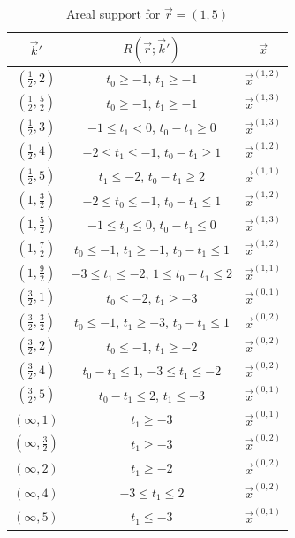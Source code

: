 \documentclass[11pt]{amsart}
\theoremstyle{definition}
\numberwithin{equation}{subsection}
\theoremstyle{plain}
\theoremstyle{plain}
\theoremstyle{plain}
\theoremstyle{plain}
\theoremstyle{plain}
\theoremstyle{plain}
\theoremstyle{plain}
\theoremstyle{plain}
\theoremstyle{plain}
\theoremstyle{plain}
\theoremstyle{plain}
\theoremstyle{plain}
\theoremstyle{definition}
\theoremstyle{definition}
\theoremstyle{definition}
\theoremstyle{remark}
\renewcommand{\(}{\textup{(}}
\renewcommand{\)}{\textup{)}}
\newcommand{\vx}{\vec{x}}
\newcommand{\vr}{\vec{r}}
\newcommand{\vk}{\vec{k}}
\begin{document}
\begin{table}[htbp]
  \centering
  \begin{tabular}{|c||c|c|}
    \hline
    $\vk'$ & $R(\vr;\vk')$ & $\vx$ \\\hline\hline
    $(\frac{1}{2},2)$ & $t_0\geq -1$, $t_1\geq -1$ & {$\vx^{(1,2)}$} \\\hline
    $(\frac{1}{2},\frac{5}{2})$ & $t_0\geq -1$, $t_1\geq -1$ & {$\vx^{(1,3)}$} \\\hline
    $(\frac{1}{2},3)$ & $-1\leq t_1<0$, $t_0-t_1\geq 0$ & {$\vx^{(1,3)}$} \\\hline
    $(\frac{1}{2},4)$ & $-2\leq t_1\leq -1$, $t_0-t_1\geq 1$ & {$\vx^{(1,2)}$} \\\hline
    $(\frac{1}{2},5)$ & $t_1\leq -2$, $t_0-t_1\geq 2$ & {$\vx^{(1,1)}$} \\\hline
    $(1,\frac{3}{2})$ & $-2\leq t_0\leq -1$, $t_0-t_1\leq 1$ & {$\vx^{(1,2)}$} \\\hline
    $(1,\frac{5}{2})$ & $-1\leq t_0\leq 0$, $t_0-t_1\leq 0$ & {$\vx^{(1,3)}$} \\\hline
    $(1,\frac{7}{2})$ & $t_0\leq -1$, $t_1\geq -1$, $t_0-t_1\leq 1$ & {$\vx^{(1,2)}$} \\\hline
    $(1,\frac{9}{2})$ & $-3\leq t_1\leq -2$, $1\leq t_0-t_1\leq 2$ & {$\vx^{(1,1)}$} \\\hline
    $(\frac{3}{2},1)$ & $t_0\leq -2$, $t_1\geq -3$ & {$\vx^{(0,1)}$} \\\hline
    $(\frac{3}{2},\frac{3}{2})$ & $t_0\leq -1$, $t_1\geq -3$, $t_0-t_1\leq 1$ & {$\vx^{(0,2)}$} \\\hline
    $(\frac{3}{2},2)$ & $t_0\leq -1$, $t_1\geq -2$ & {$\vx^{(0,2)}$} \\\hline
    $(\frac{3}{2},4)$ & $t_0-t_1\leq 1$, $-3\leq t_1\leq -2$ & {$\vx^{(0,2)}$} \\\hline
    $(\frac{3}{2},5)$ & $t_0-t_1\leq 2$, $t_1\leq -3$ & {$\vx^{(0,1)}$} \\\hline
    $(\infty,1)$ & $t_1\geq -3$ & {$\vx^{(0,1)}$} \\\hline
    $(\infty,\frac{3}{2})$ & $t_1\geq -3$ & {$\vx^{(0,2)}$} \\\hline
    $(\infty,2)$ & $t_1\geq -2$ & {$\vx^{(0,2)}$} \\\hline
    $(\infty,4)$ & $-3\leq t_1\leq 2$ &  {$\vx^{(0,2)}$}\\\hline
    $(\infty,5)$ & $t_1\leq -3$ & {$\vx^{(0,1)}$} \\
    \hline
  \end{tabular}
  \caption{Areal support for $\vr=(1,5)$}\label{tab: J((1,5))}
\end{table}
\end{document}
